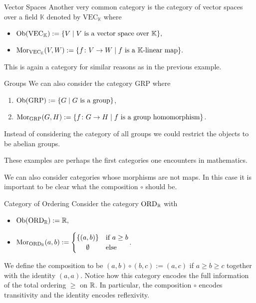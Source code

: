 \begin{example}{Vector Spaces}{}
Another very common category is the category of vector spaces over a field $\mathbb{K}$ denoted by $\mathrm{VEC}_\mathbb{K}$ where
\begin{itemize}
    \item $\mathrm {Ob}(\mathrm{VEC}_\mathbb{K}) := \{V \mid \text{$V$ is a vector space over $\mathbb{K}$}\},$
    \item $\mathrm {Mor}_{\mathrm{VEC}_\mathbb{K}}(V,W) := \{f\colon V \to W \mid \text{$f$ is a $\mathbb{K}$-linear map}\}.$
\end{itemize}
This is again a category for similar reasons as in the previous example.
\end{example}

\begin{example}{Groups}{}
We can also consider the category $\mathrm{GRP}$ where
\begin{enumerate}
    \item $\mathrm {Ob}(\mathrm{GRP}) := \{G \mid \text{$G$ is a group}\}$,
    \item $\mathrm {Mor}_{\mathrm{GRP}}(G,H) := \{f\colon G \to H \mid \text{$f$ is a group homomorphism}\}$.
\end{enumerate}
Instead of considering the category of all groups we could restrict the objects to be abelian groups.
\end{example}

These examples are perhaps the first categories one encounters in mathematics. 

We can also consider categories whose morphisms are not maps. In this case it is important to be clear what the composition $\circ$ should be.

\begin{example}{Category of Ordering}{}
Consider the category $\mathrm{ORD}_\mathbb R$ with
\begin{itemize}
    \item $\mathrm {Ob}(\mathrm{ORD}_\mathbb R) := \mathbb R,$
    \item $\mor_{\mathrm{ORD}_\R}(a,b) := \begin{cases}
        \{(a,b)\} & \text{if $a \ge b$} \\
        \hfil \emptyset & \text{else}
    \end{cases}$.
\end{itemize}
We define the composition to be $(a,b) \circ (b,c) := (a,c)$ if $a \ge b \ge c$ together with the identity $(a,a)$.
Notice how this category encodes the full information of the total ordering $\ge$ on $\mathbb R$. In particular, the composition $\circ$ encodes transitivity and the identity encodes reflexivity.
\end{example}


